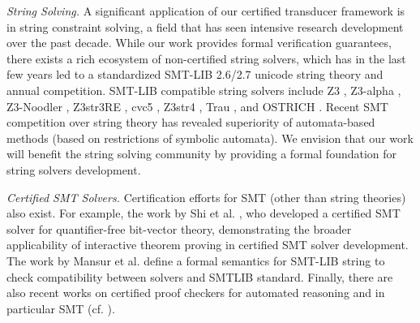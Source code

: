 \emph{String Solving.} A significant application of our certified transducer
framework is in string constraint solving, a field that has seen intensive
research development over the past decade. While our work provides formal
verification guarantees, there exists a rich ecosystem of non-certified string
solvers, which has in the last few years led to a standardized SMT-LIB 2.6/2.7 
unicode string theory and annual competition. SMT-LIB compatible string 
solvers include Z3 \cite{Z3}, Z3-alpha \cite{z3alpha}, Z3-Noodler 
\cite{noodler,noodler-int,noodler-len, noodler-tool}, Z3str3RE \cite{z3str3re},
cvc5 \cite{cvc5}, Z3str4 \cite{z3str4}, Trau \cite{Z3-trau,trau-tool}, and 
OSTRICH \cite{ostrich,CHL+19,pacmpl/ChenFHHHKLRW22}. 
Recent SMT competition over string theory has revealed
superiority of automata-based methods (based on restrictions of symbolic
automata). 
We envision that our work will benefit the string solving community by 
providing a formal foundation for string solvers development.



\emph{Certified SMT Solvers.} Certification efforts 
for SMT (other than string theories) also exist. For example, the work by Shi et al. \cite{DBLP:conf/cav/ShiFLTWY20}, who developed a certified SMT solver for quantifier-free bit-vector theory, demonstrating the broader applicability of interactive theorem proving in certified SMT solver development. The work by Mansur et al. \cite{verified-verifying} define a formal semantics for SMT-LIB string
to check compatibility between solvers and SMTLIB standard.
Finally, there are also recent works on certified proof checkers for automated 
reasoning and in particular SMT (cf. \cite{cacm-certified}).
